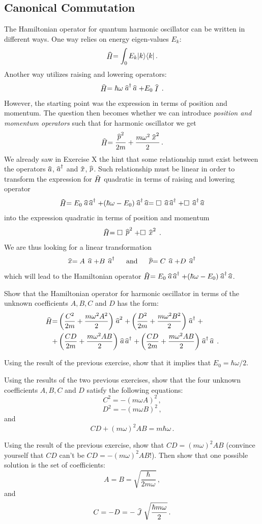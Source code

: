 \subsection{Canonical Commutation}
The Hamiltonian operator for quantum harmonic oscillator can be written in different ways. One way relies on energy eigen-values $E_k$:
\[
\op{H}=\int_0 E_k\ketbra{k}{k}\,.
\]
Another way utilizes raising and lowering operators:
\[
\op{H}=\hbar\omega \op{a}^\dagger\,\op{a}+E_0\op{I}\,.
\]
However, the starting point was the expression in terms of position and momentum. The question then becomes whether we can introduce \emph{position and momentum operators} such that for harmonic oscillator we get
\[
\op{H}=\frac{\op{p}^2}{2m}+\frac{m\omega^2\op{x}^2}{2}\,.
\]
We already saw in Exercise X the hint that some relationship must exist between the operators $\op{a}$, $\op{a}^\dagger$ and $\op{x}$, $\op{p}$. Such relationship must be linear in order to transform the expression for $\op{H}$ quadratic in terms of raising and lowering operator
\[
\op{H}=E_0\op{a}\,\op{a}^\dagger+(\hbar\omega-E_0)\op{a}^\dagger\,\op{a}=\square\,\op{a}\,\op{a}^\dagger+\square\, \op{a}^\dagger\,\op{a}
\]
into the expression quadratic in terms of position and momentum
\[
\op{H}=\square\, \op{p}^2+\square\, \op{x}^2\,.
\]
We are thus looking for a linear transformation
\[
\op{x} = A\,\op{a}+B\,\op{a}^\dagger\quad\textrm{ and }\quad \op{p}=C\,\op{a}+D\,\op{a}^\dagger
\]
which will lead to the Hamiltonian operator $\op{H}=E_0\op{a}\,\op{a}^\dagger+(\hbar\omega-E_0)\op{a}^\dagger\,\op{a}$.
\begin{exercise}
	Show that the Hamiltonian operator for harmonic oscillator in terms of the unknown coefficients $A, B, C$ and $D$ has the form:
	\begin{align*}
	\op{H}= & \left(\frac{C^2}{2m}+\frac{m\omega^2A^2}{2}\right)\op{a}^2+\left(\frac{D^2}{2m}+\frac{m\omega^2B^2}{2}\right)\op{a}^\dagger+\\
	+& \left(\frac{CD}{2m}+\frac{m\omega^2 AB}{2} \right)\op{a}\,\op{a}^\dagger+\left(\frac{CD}{2m}+\frac{m\omega^2 AB}{2} \right)\op{a}^\dagger\,\op{a}\,.
\end{align*}
\end{exercise}
\begin{exercise}
	Using the result of the previous exercise, show that it implies that $E_0=\hbar\omega/2$.
\end{exercise}
\begin{exercise}
	Using the results of the two previous exercises, show that the four unknown coefficients $A, B, C$ and $D$ satisfy the following equations:
	\[
	C^2=-(m\omega A)^2\,,
	\]
	\[
	D^2=-(m\omega B)^2\,,
	\]
	and
	\[
	CD+(m\omega)^2AB=m\hbar\omega\,.
	\]
\end{exercise}
\begin{exercise}
	Using the result of the previous exercise, show that $CD=(m\omega)^2AB$ (convince yourself that $CD$ can't be $CD=-(m\omega)^2AB$!). Then show that one possible solution is the set of coefficients:
	\[
	A=B=\sqrt{\frac{\hbar}{2m\omega}}\,,
	\]
	and
	\[
	C=-D=-\op{J}\sqrt{\frac{\hbar m\omega}{2}}\,.
	\]
\end{exercise}


